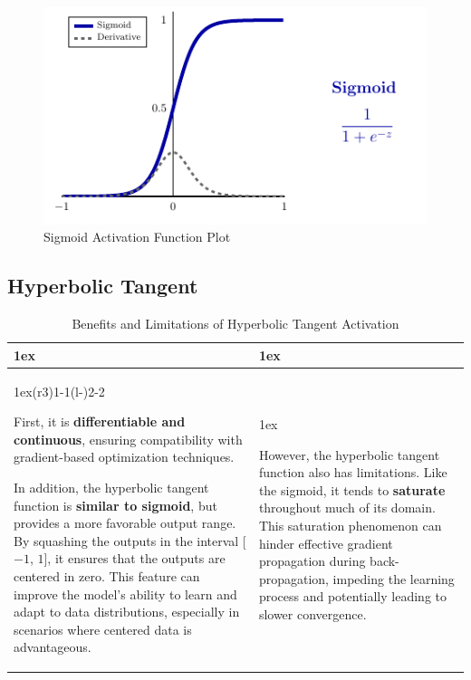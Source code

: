 \vspace{1cm}
\begin{figure}[!htbp]
    \centering
    \includegraphics[scale=2]{tikz/chapter1 - Sigmoid.pdf}
    \caption{Sigmoid Activation Function Plot}
\end{figure}

\newpage
\subsection{Hyperbolic Tangent}

\begin{table}[h]
\begin{tabularx}{\linewidth}{>{\parskip1ex}X@{\kern4\tabcolsep}>{\parskip1ex}X}
\toprule
\hfil\bfseries \color{myred}{Pros}
&
\hfil\bfseries \color{myred}{Cons}
\\\cmidrule(r{3\tabcolsep}){1-1}\cmidrule(l{-\tabcolsep}){2-2}

First, it is \textbf{\textcolor{myred}{differentiable and continuous}}, ensuring compatibility with gradient-based optimization techniques. 

In addition, the hyperbolic tangent function is \textbf{\textcolor{myred}{similar to sigmoid}}, but provides a more favorable output range. By squashing the outputs in the interval [$-1$, $1$], it ensures that the outputs are centered in zero. This feature can improve the model's ability to learn and adapt to data distributions, especially in scenarios where centered data is advantageous.
&

However, the hyperbolic tangent function also has limitations. Like the sigmoid, it tends to \textbf{\textcolor{myred}{saturate}} throughout much of its domain. This saturation phenomenon can hinder effective gradient propagation during back-propagation, impeding the learning process and potentially leading to slower convergence.
\\\bottomrule
\end{tabularx}
\caption{Benefits and Limitations of Hyperbolic Tangent Activation}
\end{table}

